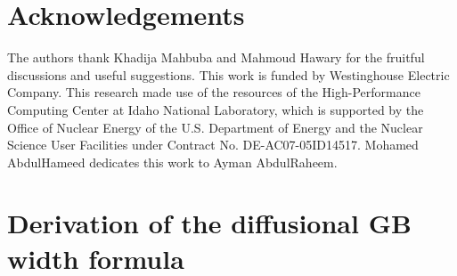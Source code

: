 \documentclass[preprint,12pt,sort&compress]{elsarticle}
\newcommand{\?}{\stackrel{?}{=}}
\begin{document}

\section{Acknowledgements}

The authors thank Khadija Mahbuba and Mahmoud Hawary for the fruitful discussions and useful suggestions. This work is funded by Westinghouse Electric Company. This research made use of the resources of the High-Performance Computing Center at Idaho National Laboratory, which is supported by the Office of Nuclear Energy of the U.S. Department of Energy and the Nuclear Science User Facilities under Contract No. DE-AC07-05ID14517. Mohamed AbdulHameed dedicates this work to Ayman AbdulRaheem.

\appendix

\section{Derivation of the diffusional GB width formula}
\label{app}
\end{document}
